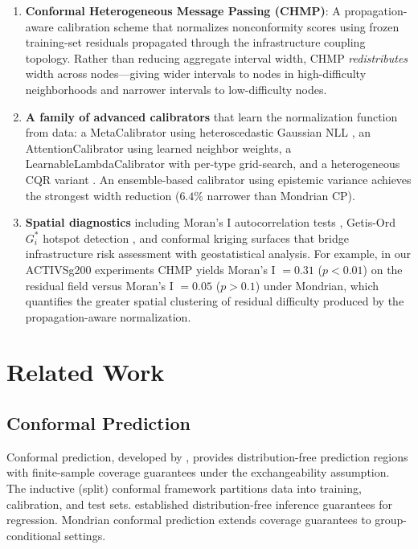 \documentclass[twoside,11pt]{article}
\begin{document}
\begin{enumerate}
\item \textbf{Conformal Heterogeneous Message Passing (CHMP)}: A
propagation-aware calibration scheme that normalizes nonconformity scores using
frozen training-set residuals propagated through the infrastructure coupling
topology. Rather than reducing aggregate interval width, CHMP
\emph{redistributes} width across nodes---giving wider intervals to nodes in
high-difficulty neighborhoods and narrower intervals to low-difficulty nodes.

\item \textbf{A family of advanced calibrators} that learn the normalization
function from data: a MetaCalibrator using heteroscedastic Gaussian NLL
\citep{kendall2017uncertainties}, an AttentionCalibrator using learned neighbor
weights, a LearnableLambdaCalibrator with per-type grid-search, and a
heterogeneous CQR variant \citep{romano2019conformalized}. An ensemble-based
calibrator using epistemic variance \citep{lakshminarayanan2017simple} achieves
the strongest width reduction ($6.4\%$ narrower than Mondrian CP).

\item \textbf{Spatial diagnostics} including Moran's I autocorrelation tests
\citep{moran1950notes}, Getis-Ord $G_i^*$ hotspot detection
\citep{getis1992analysis}, and conformal kriging surfaces \citep{cressie1993statistics}
that bridge infrastructure risk assessment with geostatistical analysis. For
example, in our ACTIVSg200 experiments CHMP yields Moran's I $=0.31$ ($p<0.01$)
on the residual field versus Moran's I $=0.05$ ($p>0.1$) under Mondrian, which
quantifies the greater spatial clustering of residual difficulty produced by
the propagation-aware normalization.
\end{enumerate}

\section{Related Work}
\label{sec:related}

\subsection{Conformal Prediction}

Conformal prediction, developed by \citet{vovk2005algorithmic}, provides
distribution-free prediction regions with finite-sample coverage guarantees under
the exchangeability assumption. The inductive (split) conformal framework
\citep{papadopoulos2002inductive} partitions data into training, calibration,
and test sets. \citet{lei2018distribution} established distribution-free
inference guarantees for regression. Mondrian conformal prediction
\citep{vovk2012conditional} extends coverage guarantees to group-conditional
settings.
\end{document}
